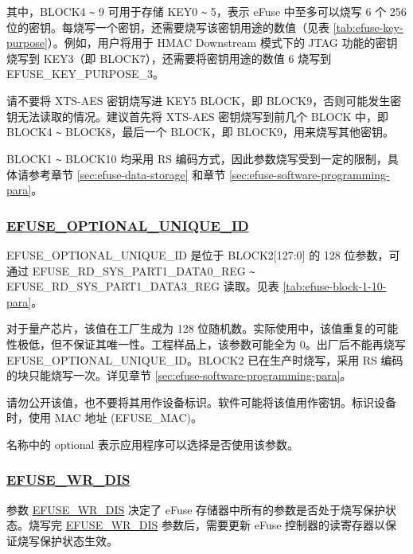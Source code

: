\documentclass[main\_\_CN.tex]{subfiles}
\begin{document}


其中，BLOCK4 \verb+~+ 9 可用于存储 KEY0 \verb+~+ 5，表示 eFuse 中至多可以烧写 6 个 256 位的密钥。每烧写一个密钥，还需要烧写该密钥用途的数值（见表 \ref{tab:efuse-key-purpose}）。例如，用户将用于 HMAC Downstream 模式下的 JTAG 功能的密钥烧写到 KEY\textcolor{myred}{3}（即 BLOCK7），还需要将密钥用途的数值 6 烧写到 EFUSE\_KEY\_PURPOSE\_\textcolor{myred}{3}。

\begin{tiplisting}
请不要将 XTS-AES 密钥烧写进 KEY5 BLOCK，即 BLOCK9，否则可能发生密钥无法读取的情况。建议首先将 XTS-AES 密钥烧写到前几个 BLOCK 中，即 BLOCK4 \verb+~+ BLOCK8，最后一个 BLOCK，即 BLOCK9，用来烧写其他密钥。
\end{tiplisting}

BLOCK1 \verb+~+ BLOCK10 均采用 RS 编码方式，因此参数烧写受到一定的限制，具体请参考章节 \ref{sec:efuse-data-storage} 和章节 \ref{sec:efuse-software-programming-para}。

\subsubsection{\texorpdfstring{\hyperref[fielddesc:EFUSEOPTIONALUNIQUEID]{EFUSE\_OPTIONAL\_UNIQUE\_ID}}{EFUSE\_OPTIONAL\_UNIQUE\_ID}}
\label{sec:efuse-optional-unique-id}

EFUSE\_OPTIONAL\_UNIQUE\_ID 是位于 BLOCK2[127:0] 的 128 位参数，可通过 EFUSE\_RD\_SYS\_PART1\_DATA0\_REG \verb+~+ EFUSE\_RD\_SYS\_PART1\_DATA3\_REG 读取。见表 \ref{tab:efuse-block-1-10-para}。

对于量产芯片，该值在工厂生成为 128 位随机数。实际使用中，该值重复的可能性极低，但不保证其唯一性。工程样品上，该参数可能全为 0。出厂后不能再烧写 EFUSE\_OPTIONAL\_UNIQUE\_ID。BLOCK2 已在生产时烧写，采用 RS 编码的块只能烧写一次。详见章节 \ref{sec:efuse-software-programming-para}。

请勿公开该值，也不要将其用作设备标识。软件可能将该值用作密钥。标识设备时，使用 MAC 地址 (EFUSE\_MAC)。

名称中的 optional 表示应用程序可以选择是否使用该参数。

\subsubsection{\hyperref[fielddesc:EFUSEWRDIS]{EFUSE\_WR\_DIS}}
\label{sec:efuse-wr-dis}

参数 \hyperref[fielddesc:EFUSEWRDIS]{EFUSE\_WR\_DIS} 决定了 eFuse 存储器中所有的参数是否处于烧写保护状态。烧写完 \hyperref[fielddesc:EFUSEWRDIS]{EFUSE\_WR\_DIS} 参数后，需要更新 eFuse 控制器的读寄存器以保证烧写保护状态生效。
\end{document}

